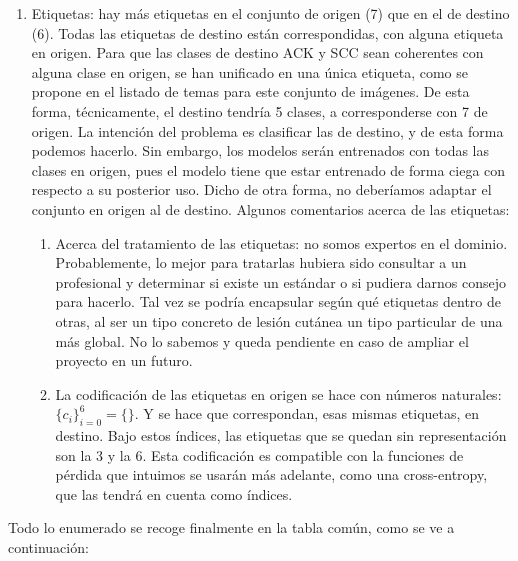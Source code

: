 \documentclass[10pt,a4paper]{article}
\renewcommand{\_}{\guionbajo\allowbreak}
\begin{document}
\begin{enumerate}
    \item Etiquetas: hay más etiquetas en el conjunto de origen (7) que en el de destino (6). Todas las etiquetas de destino están 
    correspondidas, con alguna etiqueta en origen. Para que las clases de destino ACK y SCC sean coherentes con alguna clase en origen,
    se han unificado en una única etiqueta, como se propone en el listado de temas para este conjunto de imágenes. De esta forma, técnicamente, 
    el destino tendría 5 clases, a corresponderse con 7 de origen. La intención del problema es clasificar las de destino, y de esta forma podemos 
    hacerlo. Sin embargo, los modelos serán entrenados con todas las clases en origen, pues el modelo tiene que estar entrenado de forma ciega con 
    respecto a su posterior uso. Dicho de otra forma, no deberíamos adaptar el conjunto en origen al de destino. Algunos comentarios acerca de las etiquetas:

    \begin{enumerate}

        \item Acerca del tratamiento de las etiquetas: no somos expertos en el dominio. Probablemente, lo mejor para tratarlas hubiera 
        sido consultar a un profesional y determinar si existe un estándar o si pudiera darnos consejo para hacerlo. Tal vez se podría 
        encapsular según qué etiquetas dentro de otras, al ser un tipo concreto de lesión cutánea un tipo particular de una más global. 
        No lo sabemos y queda pendiente en caso de ampliar el proyecto en un futuro. 

        \item La codificación de las etiquetas en origen se hace con números naturales: $\{c_i\}_{i=0}^6 = \{\}$. Y se hace que 
        correspondan, esas mismas etiquetas, en destino. Bajo estos índices, las etiquetas que se quedan sin representación son la 
        3 y la 6. Esta codificación es compatible con la funciones de pérdida que intuimos se usarán más adelante, como una cross-entropy, 
        que las tendrá en cuenta como índices.

    \end{enumerate} 
\end{enumerate}

\noindent Todo lo enumerado se recoge finalmente en la tabla común, como se ve a continuación:
\end{document}

